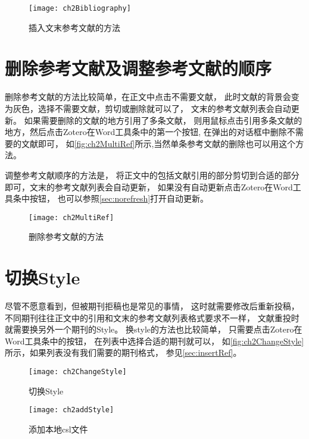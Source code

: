 \documentclass[theorem=false,mathfont=none,openany,sub3section]{easybook}
\begin{document}
\begin{enumerate}
	\begin{figure}[htbp]
		\centering
		\texttt{[image: ch2Bibliography]}
		\caption{插入文末参考文献的方法}
		\label{fig:ch2Bibliography}
	\end{figure}
\end{enumerate}

\section{删除参考文献及调整参考文献的顺序}
删除参考文献的方法比较简单，在正文中点击不需要文献，
此时文献的背景会变为灰色，选择不需要文献，剪切或删除就可以了，
文末的参考文献列表会自动更新。
如果需要删除的文献的地方引用了多条文献，
则用鼠标点击引用多条文献的地方，然后点击Zotero在Word工具条中的第一个按钮,
在弹出的对话框中删除不需要的文献即可，
如\autoref{fig:ch2MultiRef}所示,当然单条参考文献的删除也可以用这个方法。

调整参考文献顺序的方法是，
将正文中的包括文献引用的部分剪切到合适的部分即可，文末的参考文献列表会自动更新，
如果没有自动更新点击Zotero在Word工具条中按钮，
也可以参照\cref{sec:norefresh}打开自动更新。

\begin{figure}[htbp]
	\centering
	\texttt{[image: ch2MultiRef]}
	\caption{删除参考文献的方法}
	\label{fig:ch2MultiRef}
\end{figure}

\section{切换Style}\label{sec:changeStyle}
尽管不愿意看到，但被期刊拒稿也是常见的事情，
这时就需要修改后重新投稿，不同期刊往往正文中的引用和文末的参考文献列表格式要求不一样，
文献重投时就需要换另外一个期刊的Style。
换style的方法也比较简单，
只需要点击Zotero在Word工具条中的按钮，
在列表中选择合适的期刊就可以，
如\autoref{fig:ch2ChangeStyle}所示，如果列表没有我们需要的期刊格式，
参见\cref{sec:insertRef}。
\begin{figure}
	\centering
	\texttt{[image: ch2ChangeStyle]}
	\caption{切换Style}
	\label{fig:ch2ChangeStyle}
\end{figure}
\begin{figure}[htbp]
	\centering
	\texttt{[image: ch2addStyle]}
	\caption{添加本地csl文件}
	\label{fig:ch2addStyle}
\end{figure}
\end{document}
